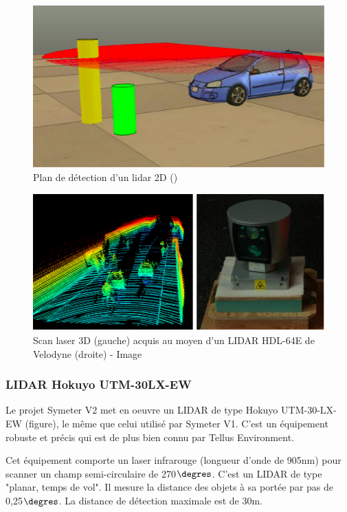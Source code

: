 \documentclass[12pt,a4paper]{report}
\begin{document}
	\begin{figure}[h!]
		\centering
		\includegraphics[width=0.7\linewidth]{img/lidar2d}
		\caption[Lidar 2D]{Plan de détection d'un lidar 2D (\cite{yalcin_approaches_2013})}
		\label{fig:lidar2d}
	\end{figure}

	\begin{figure}[h!]
	\centering
	\includegraphics[width=0.7\linewidth]{img/lidar3d}
	\caption[lidar3d]{Scan laser 3D (gauche) acquis au moyen d'un LIDAR \hspace{\textwidth} HDL-64E de Velodyne (droite) - Image \cite{steinbauer_tedusar_2014}}
	\label{fig:lidar3d}
	\end{figure}

	
		
		\subsubsection{LIDAR Hokuyo UTM-30LX-EW}
		Le projet Symeter V2 met en oeuvre un LIDAR de type Hokuyo UTM-30-LX-EW (figure), le même que celui utilisé par Symeter V1. C'est un équipement robuste et précis qui est de plus bien connu par Tellus Environment.
		
		\para Cet équipement comporte un laser infrarouge (longueur d'onde de 905nm) pour scanner un champ semi-circulaire de 270$\degres$. C'est un LIDAR de type "planar, temps de vol". Il mesure la distance des objets à sa portée par pas de 0,25$\degres$. La distance de détection maximale est de 30m.
		\newline
		
\end{document}

